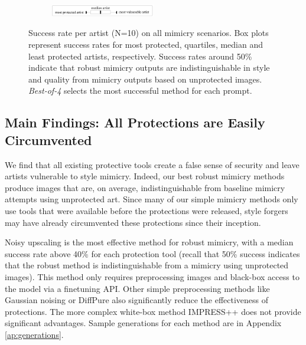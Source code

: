 \documentclass{article}
\begin{document}
\begin{figure}[h]
    \centering
    \begin{subfigure}[t]{\textwidth}
    \centering
    \includegraphics[width=0.5\textwidth]{plots/legend.pdf}
    \end{subfigure}
    \hspace*{-3.3cm}
    \begin{subfigure}[t]{\textwidth}
    \end{subfigure}
    \caption{Success rate per artist (N=10) on all mimicry scenarios. Box plots represent success rates for most protected, quartiles, median and least protected artists, respectively. Success rates around 50\% indicate that robust mimicry outputs are indistinguishable
    in style and quality from mimicry outputs based on unprotected images. \emph{Best-of-4} selects the most successful method for each prompt.}
    \label{fig:resultsmain}
\end{figure}

\subsection{Main Findings: All Protections are Easily Circumvented} %
We find that all existing protective tools create a false sense of security and leave artists vulnerable to style mimicry. Indeed, our best robust mimicry methods produce images that are, on average, indistinguishable from baseline mimicry attempts using unprotected art.
Since many of our simple mimicry methods only use tools that were available before the protections were released, style forgers may have already circumvented these protections since their inception.

Noisy upscaling is the most effective method for robust mimicry, with a median success rate above 40\% for each protection tool (recall that 50\% success indicates that the robust method is indistinguishable from a mimicry using unprotected images). This method only requires preprocessing images and black-box access to the model via a finetuning API. Other simple preprocessing methods like Gaussian noising or DiffPure also significantly reduce the effectiveness of protections. The more complex white-box method IMPRESS++ does not provide significant advantages. Sample generations for each method are in Appendix \ref{ap:generations}.
\end{document}
